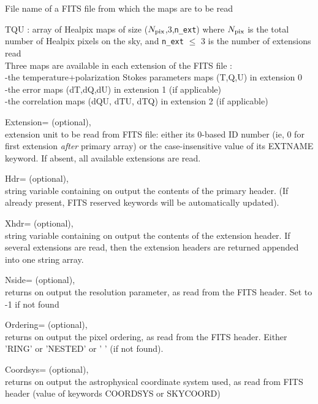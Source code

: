 \begin{qualifiers}
  \begin{qulist}{} %
 	\item[{File}] 
          name of a FITS file from which the maps are to be read

   \item[{TQU}] : array of Healpix maps of size ($N_{\rm pix}$,3,{\tt n\_ext}) where $N_{\rm pix}$ is the total
   number of Healpix pixels on the sky, and {\tt n\_ext} $\le$ 3 is
   the number of extensions read\\
     Three maps are available in each extension of the FITS file : \\
      -the temperature+polarization Stokes parameters maps (T,Q,U) in
   extension 0 \\
      -the error maps (dT,dQ,dU) in extension 1 (if applicable)\\
      -the correlation maps (dQU, dTU, dTQ) in extension 2 (if applicable)

       \item[{Extension=}]
		(optional), \\
	extension unit to be read from FITS file: 
 either its 0-based ID number (ie, 0 for first extension {\em after} primary array) 
 or the case-insensitive value of its EXTNAME keyword.
	If absent, all available extensions are read.

       \item[{Hdr=}]
		  (optional), \\
		string variable containing on output  the contents of the primary header. (If already present, FITS reserved
		  keywords will be automatically updated).

       \item[{Xhdr=}]
		  (optional), \\
		string variable containing on output the contents of the
		  extension header. If 
                  several extensions are read, then the extension 
                  headers are returned appended into one string array.

	 \item[{Nside=}]
		(optional), \\
	        returns on output the \healpix resolution parameter, as read
		from the FITS header. Set to -1 if not found

	 \item[{Ordering=}]
	        (optional), \\
	        returns on output the pixel ordering, as read from the FITS
	        header. Either 'RING' or 'NESTED' or ' ' (if not found).

	 \item[{Coordsys=}]
	        (optional), \\
	        returns on output the astrophysical coordinate system used, 
		as read from FITS header (value of keywords COORDSYS or SKYCOORD)

  \end{qulist}
\end{qualifiers}


